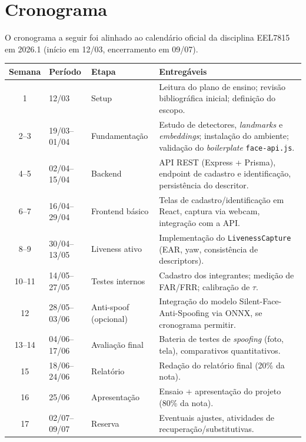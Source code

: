 \documentclass[12pt,a4paper]{article}
\begin{document}
\section{Cronograma}

O cronograma a seguir foi alinhado ao calend\'ario oficial da disciplina EEL7815 em
2026.1 (in\'icio em 12/03, encerramento em 09/07).

\begin{center}
\begin{tabular}{cllp{6.8cm}}
\toprule
\textbf{Semana} & \textbf{Per\'iodo} & \textbf{Etapa} & \textbf{Entreg\'aveis} \\
\midrule
1     & 12/03         & Setup           & Leitura do plano de ensino; revis\~ao bibliogr\'afica inicial; defini\c{c}\~ao do escopo. \\
2--3  & 19/03--01/04  & Fundamenta\c{c}\~ao  & Estudo de detectores, \emph{landmarks} e \emph{embeddings}; instala\c{c}\~ao do ambiente; valida\c{c}\~ao do \emph{boilerplate} \texttt{face-api.js}. \\
4--5  & 02/04--15/04  & Backend         & API REST (Express + Prisma), endpoint de cadastro e identifica\c{c}\~ao, persist\^encia do descritor. \\
6--7  & 16/04--29/04  & Frontend b\'asico    & Telas de cadastro/identifica\c{c}\~ao em React, captura via webcam, integra\c{c}\~ao com a API. \\
8--9  & 30/04--13/05  & Liveness ativo  & Implementa\c{c}\~ao do \texttt{LivenessCapture} (EAR, yaw, consist\^encia de descriptors). \\
10--11 & 14/05--27/05 & Testes internos & Cadastro dos integrantes; medi\c{c}\~ao de FAR/FRR; calibra\c{c}\~ao de $\tau$. \\
12    & 28/05--03/06  & Anti-spoof (opcional) & Integra\c{c}\~ao do modelo Silent-Face-Anti-Spoofing via ONNX, se cronograma permitir. \\
13--14 & 04/06--17/06 & Avalia\c{c}\~ao final  & Bateria de testes de \emph{spoofing} (foto, tela), comparativos quantitativos. \\
15    & 18/06--24/06  & Relat\'orio    & Reda\c{c}\~ao do relat\'orio final (20\% da nota). \\
16    & 25/06         & Apresenta\c{c}\~ao    & Ensaio + apresenta\c{c}\~ao do projeto (80\% da nota). \\
17    & 02/07--09/07  & Reserva       & Eventuais ajustes, atividades de recupera\c{c}\~ao/substitutivas. \\
\bottomrule
\end{tabular}
\end{center}
\end{document}
